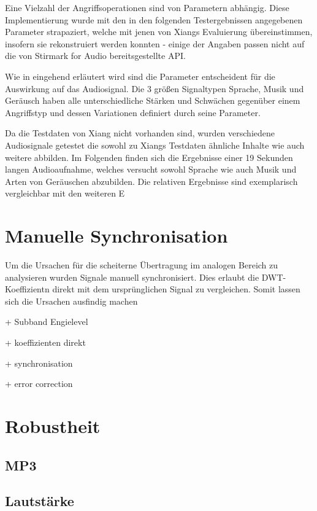 Eine Vielzahl der Angriffsoperationen sind von Parametern abhängig. Diese Implementierung wurde mit den in den folgenden Testergebnissen angegebenen Parameter strapaziert, welche mit jenen von Xiangs Evaluierung\cite{xiang2007robust} übereinstimmen, insofern sie rekonstruiert werden konnten - einige der Angaben passen nicht auf die von Stirmark for Audio bereitsgestellte API. 

Wie in \cite{lang2004stirmark} eingehend erläutert wird sind die Parameter entscheident für die Auswirkung auf das Audiosignal. Die 3 größen Signaltypen Sprache, Musik und Geräusch haben alle unterschiedliche Stärken und Schwächen gegenüber einem Angriffstyp und dessen Variationen definiert durch seine Parameter. 

Da die Testdaten von Xiang nicht vorhanden sind, wurden verschiedene Audiosignale getestet die sowohl zu Xiangs Testdaten ähnliche Inhalte wie auch weitere abbilden. Im Folgenden finden sich die Ergebnisse einer 19 Sekunden langen Audioaufnahme, welches versucht sowohl Sprache wie auch Musik und Arten von Geräuschen abzubilden. Die relativen Ergebnisse sind exemplarisch vergleichbar mit den weiteren E


 

\section{Manuelle Synchronisation}

Um die Ursachen für die scheiterne Übertragung im analogen Bereich zu analysieren wurden Signale manuell synchronisiert. Dies erlaubt die DWT-Koeffizientn direkt mit dem ursprünglichen Signal zu vergleichen. Somit lassen sich die Ursachen ausfindig machen

+ Subband Engielevel

+ koeffizienten direkt

+ synchronisation

+ error correction

\section{Robustheit}

\subsection{MP3}

\subsection{Lautstärke}


